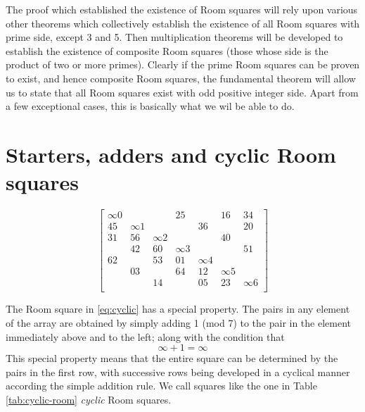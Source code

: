 \documentclass[
  11pt,
  a4paper]{book}
\begin{document}
The proof which established the existence of Room squares
will rely upon various other theorems which collectively
establish the existence of all Room squares with prime side,
except 3 and 5. Then multiplication theorems will be
developed to establish the existence of composite Room
squares (those whose side is the product of two or more
primes). Clearly if the prime Room squares can be proven to
exist, and hence composite Room squares, the fundamental
theorem will allow us to state that all Room squares exist
with odd positive integer side. Apart from a few exceptional
cases, this is basically what we wil be able to do.

\hypertarget{starters-adders-and-cyclic-room-squares}{%
\section{Starters, adders and cyclic Room squares}\label{starters-adders-and-cyclic-room-squares}}

\begin{equation}
  \begin{bmatrix}
    \infty 0 &          &          &     25     &          &     16     &    34    \\
      45     & \infty 1 &          &            &    36    &            &    20    \\
      31     &    56    & \infty 2 &            &          &     40     &          \\
             &    42    &    60    &  \infty 3  &          &            &    51    \\
      62     &          &    53    &     01     & \infty 4 &            &          \\
             &    03    &          &     64     &    12    &  \infty 5  &          \\
             &          &    14    &            &    05    &     23     & \infty 6 \\
  \end{bmatrix}
  \label{eq:cyclic}
\end{equation}

The Room square in \eqref{eq:cyclic} has a
special property. The pairs in any element of the array are
obtained by simply adding 1 (mod 7) to the pair in the
element immediately above and to the left; along with the
condition that \[\infty+1 = \infty\] This special property
means that the entire square can be determined by the pairs
in the first row, with successive rows being developed in a
cyclical manner according the simple addition rule. We call
squares like the one in Table \ref{tab:cyclic-room} \emph{cyclic}
Room squares.
\end{document}
